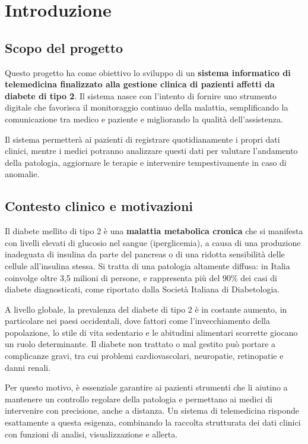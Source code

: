 \section{Introduzione}

\subsection{Scopo del progetto}
Questo progetto ha come obiettivo lo sviluppo di un \textbf{sistema informatico di telemedicina finalizzato alla gestione clinica di pazienti affetti da diabete di tipo 2}. Il sistema nasce con l’intento di fornire uno strumento digitale che favorisca il monitoraggio continuo della malattia, semplificando la comunicazione tra medico e paziente e migliorando la qualità dell’assistenza.

Il sistema permetterà ai pazienti di registrare quotidianamente i propri dati clinici, mentre i medici potranno analizzare questi dati per valutare l’andamento della patologia, aggiornare le terapie e intervenire tempestivamente in caso di anomalie.

\subsection{Contesto clinico e motivazioni}
Il diabete mellito di tipo 2 è una \textbf{malattia metabolica cronica} che si manifesta con livelli elevati di glucosio nel sangue (iperglicemia), a causa di una produzione inadeguata di insulina da parte del pancreas o di una ridotta sensibilità delle cellule all’insulina stessa. Si tratta di una patologia altamente diffusa: in Italia coinvolge oltre 3,5 milioni di persone, e rappresenta più del 90\% dei casi di diabete diagnosticati, come riportato dalla Società Italiana di Diabetologia.

A livello globale, la prevalenza del diabete di tipo 2 è in costante aumento, in particolare nei paesi occidentali, dove fattori come l’invecchiamento della popolazione, lo stile di vita sedentario e le abitudini alimentari scorrette giocano un ruolo determinante. Il diabete non trattato o mal gestito può portare a complicanze gravi, tra cui problemi cardiovascolari, neuropatie, retinopatie e danni renali.

Per questo motivo, è essenziale garantire ai pazienti strumenti che li aiutino a mantenere un controllo regolare della patologia e permettano ai medici di intervenire con precisione, anche a distanza. Un sistema di telemedicina risponde esattamente a questa esigenza, combinando la raccolta strutturata dei dati clinici con funzioni di analisi, visualizzazione e allerta.

